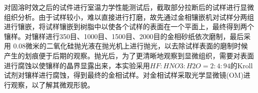 对固溶时效之后的试件进行室温力学性能测试后，截取部分拉断后的试样进行显微组织分析。由于试样较小，难以直接进行打磨，故先通过金相镶嵌机对试样分两组进行镶嵌，将试样镶嵌到树脂中以使各个试样的表面在一个平面上，最终得到两个镶样。对镶样进行350目、1000目、1500目、2000目的金相砂纸依次磨制，最后采用 0.08微米的二氧化硅抛光液在抛光机上进行抛光，以去除试样表面的磨制时候产生的划痕便于后期的观察。抛光后，为了更清晰地观察到显微组织，需要对表面进行腐蚀以使镶样的晶界显露出来，本实验采用$ HF:HNO3:H2O=2:4:94 $的Kroll试剂对镶样进行腐蚀，得到最终的金相试样。对金相试样采取光学显微镜(OM)进行观察，以了解其微观形貌。
\begin{figure}[htbp]
	\centering
\end{figure}
